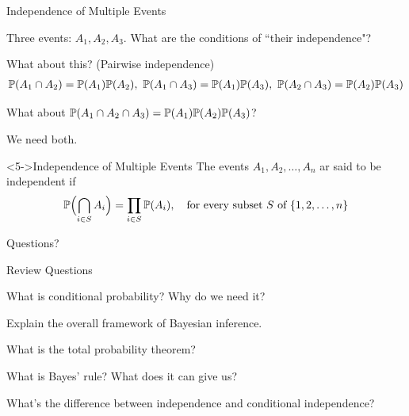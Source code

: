 \begin{frame}{Independence of Multiple Events}

\plitemsep 0.1in
\bci 

\item<1-> Three events: $A_1, A_2, A_3.$ What are the conditions of ``their independence"?

\item<2-> What about this? (Pairwise independence)
\begin{align*}
\mathbb{P}( A_1 \cap A_2 ) = \mathbb{P}( A_1 ) \mathbb{P}( A_2 ), \
\mathbb{P}( A_1 \cap A_3 ) = \mathbb{P}( A_1 ) \mathbb{P}( A_3 ), \
\mathbb{P}( A_2 \cap A_3 ) = \mathbb{P}( A_2 ) \mathbb{P}( A_3 )
\end{align*}

\item<3-> What about $\mathbb{P}( A_1 \cap A_2 \cap A_3 ) = \mathbb{P}( A_1 ) \mathbb{P}( A_2 ) \mathbb{P}( A_3 )$?

\item<4-> We need both. 

\begin{block}<5->{Independence of Multiple Events}
The events $A_1,A_2, \ldots, A_n$ ar said to be independent if
$$
\mathbb{P}\Bigl( \bigcap_{i \in S} A_i \Bigr) = \prod_{i \in S} \mathbb{P}( A_i ), \quad \text{for every subset } S \text{ of } \{1,2, \ldots, n \}
$$
\end{block}
\eci 
\end{frame}


\begin{frame}{}
\vspace{2cm}
\LARGE Questions?

\end{frame}

\begin{frame}{Review Questions}
\bce[1)]
\item What is conditional probability? Why do we need it?

\item Explain the overall framework of Bayesian inference.

\item What is the total probability theorem?

\item What is Bayes' rule? What does it can give us?

\item What's the difference between independence and conditional independence?

\ece
\end{frame}


